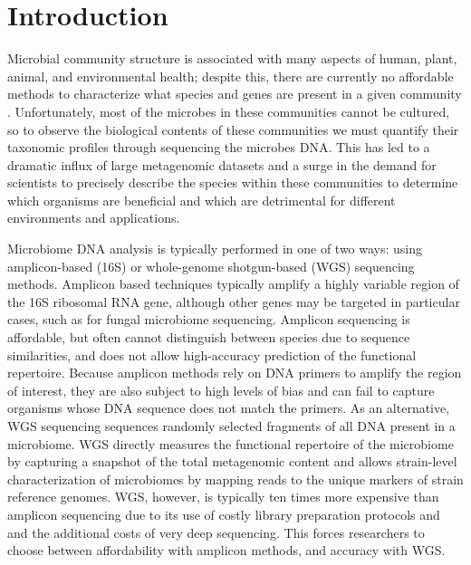 \section{Introduction}

Microbial community structure is associated with many aspects of human, plant, animal, and environmental health; despite this, there are currently no affordable methods to characterize what species and genes are present in a given community \cite{prifti_new_2013}. Unfortunately, most of the microbes in these communities cannot be cultured, so to observe the biological contents of these communities we must quantify their taxonomic profiles through sequencing the microbes DNA. This has led to a dramatic influx of large metagenomic datasets and a surge in the demand for scientists to precisely describe the species within these communities to determine which organisms are beneficial and which are detrimental for different environments and applications.

Microbiome DNA analysis is typically performed in one of two ways: using amplicon-based (16S) or whole-genome shotgun-based (WGS) sequencing methods. Amplicon based techniques typically amplify a highly variable region of the 16S ribosomal RNA gene, although other genes may be targeted in particular cases, such as for fungal microbiome sequencing. Amplicon sequencing is affordable, but often cannot distinguish between species due to sequence similarities, and does not allow high-accuracy prediction of the functional repertoire. Because amplicon methods rely on DNA primers to amplify the region of interest, they are also subject to high levels of bias and can fail to capture organisms whose DNA sequence does not match the primers. As an alternative, WGS sequencing sequences randomly selected fragments of all DNA present in a microbiome. WGS directly measures the functional repertoire of the microbiome by capturing a snapshot of the total metagenomic content and allows strain-level characterization of microbiomes by mapping reads to the unique markers of strain reference genomes. WGS, however, is typically ten times more expensive than amplicon sequencing due to its use of costly library preparation protocols and and the additional costs of very deep sequencing. This forces researchers to choose between affordability with amplicon methods, and accuracy with WGS.


